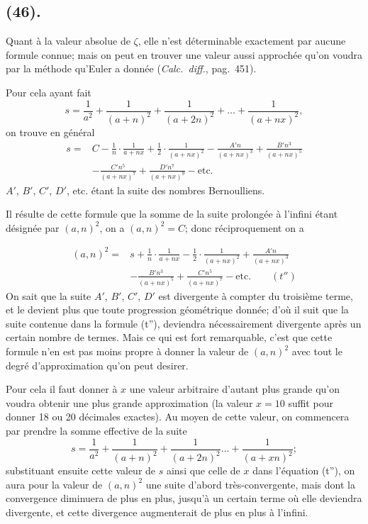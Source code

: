 \documentclass{article}
\begin{document}
\subsection*{(46).}

Quant à la valeur absolue de $\zeta$, elle n'est déterminable exactement par aucune formule connue; mais on peut en trouver une valeur aussi approchée qu'on voudra par la méthode qu'Euler a donnée (\emph{Calc.\ diff.}, pag.\ 451).

Pour cela ayant fait
\[ s=\frac{1}{a^{2}}+\frac{1}{(a+n)^{2}}+\frac{1}{(a+2n)^{2}}+\ldots+\frac{1}{(a+nx)^{2}}, \]
on trouve en général
\[ \begin{aligned} s={}&C-\frac{1}{n}\cdot\frac{1}{a+nx}+\frac{1}{2}\cdot\frac{1}{(a+nx)^{2}}-\frac{A'n}{(a+nx)^{3}}+\frac{B'n^{3}}{(a+nx)^{5}}\\ &-\frac{C'n^{5}}{(a+nx)^{7}}+\frac{D'n^{7}}{(a+nx)^{9}}-\text{etc.} \end{aligned} \]
$A'$, $B'$, $C'$, $D'$, etc. étant la suite des nombres Bernoulliens.

Il résulte de cette formule que la somme de la suite prolongée à l'infini étant désignée par $(a,n)^{2}$, on a $(a,n)^{2}=C$; donc réciproquement on a

\[ \begin{aligned} (a,n)^{2}={}&s+\frac{1}{n}\cdot\frac{1}{a+nx}-\frac{1}{2}\cdot\frac{1}{(a+nx)^{2}}+\frac{A'n}{(a+nx)^{3}}\\ &-\frac{B'n^{3}}{(a+nx)^{5}}+\frac{C'n^{5}}{(a+nx)^{7}}-\text{etc.}\qquad(t'') \end{aligned} \]
On sait que la suite $A'$, $B'$, $C'$, $D'$ est divergente à compter du troisième terme, et le devient plus que toute progression géométrique donnée; d'où il suit que la suite contenue dans la formule (t''), deviendra nécessairement divergente après un certain nombre de termes. Mais ce qui est fort remarquable, c'est que cette formule n'en est pas moins propre à donner la valeur de $(a,n)^{2}$ avec tout le degré d'approximation qu'on peut desirer.

Pour cela il faut donner à $x$ une valeur arbitraire d'autant plus grande qu'on voudra obtenir une plus grande approximation (la valeur $x=10$ suffit pour donner 18 ou 20 décimales exactes). Au moyen de cette valeur, on commencera par prendre la somme effective de la suite
\[ s=\frac{1}{a^{2}}+\frac{1}{(a+n)^{2}}+\frac{1}{(a+2n)^{2}}\ldots+\frac{1}{(a+xn)^{2}}; \]
substituant ensuite cette valeur de $s$ ainsi que celle de $x$ dans l'équation (t''), on aura pour la valeur de $(a,n)^{2}$ une suite d'abord très-convergente, mais dont la convergence diminuera de plus en plus, jusqu'à un certain terme où elle deviendra divergente, et cette divergence augmenterait de plus en plus à l'infini.
\end{document}
